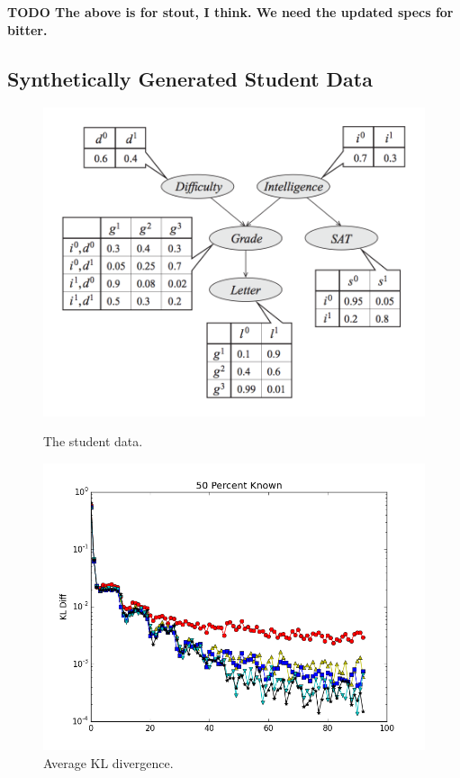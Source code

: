 \documentclass{article} %
\begin{document}
\textbf{TODO The above is for stout, I think. We need the updated specs for bitter.}

\subsection{Synthetically Generated Student Data}\label{ssec:student_data}

\begin{figure}[t]
  \centering
  \begin{minipage}{.46\textwidth}
    \centering
    \includegraphics[width=1\textwidth]{fig_student_diagram}
    \caption{The student data.}
    \label{fig:student_diagram}
  \end{minipage}\hfill
    \begin{minipage}{.5\textwidth}
    \centering
    \includegraphics[width=1\textwidth]{fig_kl_student_50perc}
    \caption{Average KL divergence.}
    \label{fig:kl_accuracy}
  \end{minipage}
\end{figure}
\end{document}
